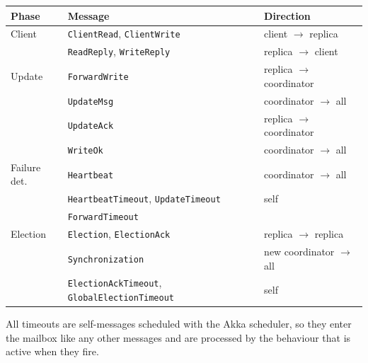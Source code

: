 \begin{center}
  \begin{tabular}{l l l}
    \textbf{Phase} & \textbf{Message} & \textbf{Direction} \\
    \hline
    Client         & \texttt{ClientRead}, \texttt{ClientWrite}  & client $\to$ replica \\
                   & \texttt{ReadReply}, \texttt{WriteReply}    & replica $\to$ client \\
    Update         & \texttt{ForwardWrite}                      & replica $\to$ coordinator \\
                   & \texttt{UpdateMsg}                         & coordinator $\to$ all \\
                   & \texttt{UpdateAck}                         & replica $\to$ coordinator \\
                   & \texttt{WriteOk}                           & coordinator $\to$ all \\
    Failure det.   & \texttt{Heartbeat}                         & coordinator $\to$ all \\
                   & \texttt{HeartbeatTimeout}, \texttt{UpdateTimeout}        & self \\
                   & \texttt{ForwardTimeout}                    & \\
    Election       & \texttt{Election}, \texttt{ElectionAck}    & replica $\to$ replica \\
                   & \texttt{Synchronization}                   & new coordinator $\to$ all \\
                   & \texttt{ElectionAckTimeout}, \texttt{GlobalElectionTimeout} & self \\
  \end{tabular}
\end{center}

All timeouts are self-messages scheduled with the Akka scheduler, so they enter the mailbox like any other messages and are processed by the behaviour that is active when they fire.
